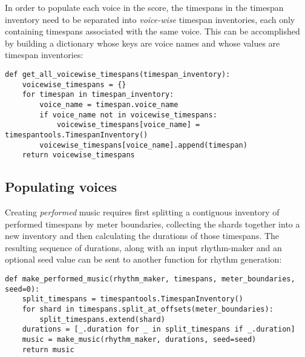\noindent In order to populate each voice in the score, the timespans in the
timespan inventory need to be separated into \emph{voice-wise} timespan
inventories, each only containing timespans associated with the same voice.
This can be accomplished by building a dictionary whose keys are voice names
and whose values are timespan inventories:

\begin{comment}
<abjadextract dissertation.py.time_tools:get_all_voicewise_timespans />[strip_prompt]
\end{comment}

\begin{singlespacing}
\vspace{-0.5\baselineskip}
\begin{lstlisting}
def get_all_voicewise_timespans(timespan_inventory):
    voicewise_timespans = {}
    for timespan in timespan_inventory:
        voice_name = timespan.voice_name
        if voice_name not in voicewise_timespans:
            voicewise_timespans[voice_name] = timespantools.TimespanInventory()
        voicewise_timespans[voice_name].append(timespan)
    return voicewise_timespans
\end{lstlisting}
\end{singlespacing}

\subsection{Populating voices}

Creating \emph{performed} music requires first splitting a contiguous inventory
of performed timespans by meter boundaries, collecting the shards together into
a new inventory and then calculating the durations of those timespans. The
resulting sequence of durations, along with an input rhythm-maker and an
optional seed value can be sent to another function for rhythm generation:

\begin{comment}
<abjadextract dissertation.py.time_tools:make_performed_music />[strip_prompt]
\end{comment}

\begin{singlespacing}
\vspace{-0.5\baselineskip}
\begin{lstlisting}
def make_performed_music(rhythm_maker, timespans, meter_boundaries, seed=0):
    split_timespans = timespantools.TimespanInventory()
    for shard in timespans.split_at_offsets(meter_boundaries):
        split_timespans.extend(shard)
    durations = [_.duration for _ in split_timespans if _.duration]
    music = make_music(rhythm_maker, durations, seed=seed)
    return music
\end{lstlisting}
\end{singlespacing}

